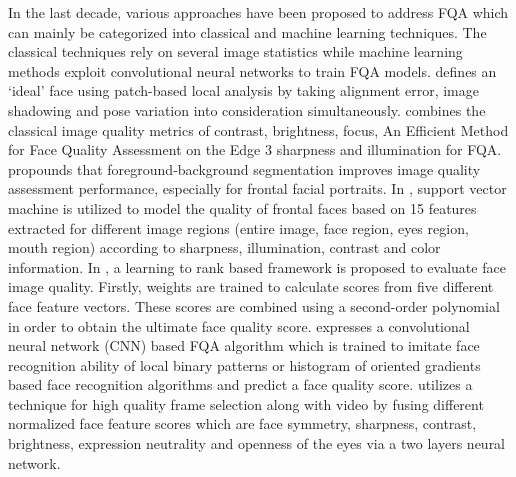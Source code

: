 \documentclass[runningheads]{llncs}
\begin{document}
In the last decade, various approaches have been proposed to address FQA which can mainly be categorized into classical and machine learning techniques. The classical techniques rely on several image statistics while machine learning methods exploit convolutional neural networks to train FQA models. \cite{Wong}  defines an ‘ideal’ face using patch-based local analysis by taking alignment error, image shadowing and pose variation into consideration simultaneously. \cite{Abaza} combines the classical image quality metrics of contrast, brightness, focus, An Efficient Method for Face Quality Assessment on the Edge 3 sharpness and illumination for FQA. \cite{Lienhard-2014} propounds that foreground-background segmentation improves image quality assessment performance, especially for frontal facial portraits. In \cite{Lienhard-2015}, support vector machine is utilized to model the quality of frontal faces based on 15 features extracted for different image regions (entire image, face region, eyes region, mouth region) according to sharpness, illumination, contrast and color information. In \cite{Chen2015FaceIQ}, a learning to rank based framework is proposed to evaluate face image quality. Firstly, weights are trained to calculate scores from five different face feature vectors. These scores are combined using a second-order polynomial in order to obtain the ultimate face quality score. \cite{Vignesh-2015} expresses a convolutional neural network (CNN) based FQA algorithm which is trained to imitate face recognition ability of local binary patterns or histogram of oriented gradients based face recognition algorithms and predict a face quality score. \cite{Anantharajah} utilizes a technique for high quality frame selection along with video by fusing different normalized face feature scores which are face symmetry, sharpness, contrast, brightness, expression neutrality and openness of the eyes via a two layers neural network. 
\end{document}
